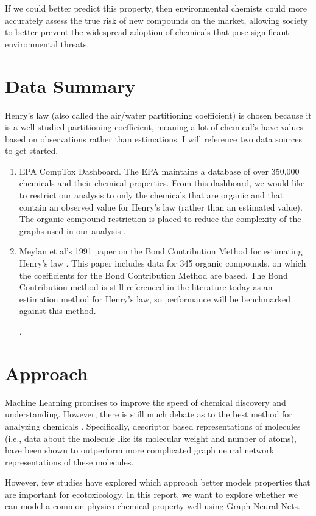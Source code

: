 \documentclass[12pt, oneside]{article}   	%
\begin{document}
If we could better predict this property, then environmental chemists could more accurately assess the true risk of new compounds on the market, allowing society to better prevent the widespread adoption of chemicals that pose significant environmental threats.

\section{Data Summary}
Henry's law (also called the air/water partitioning coefficient) is chosen because it is a well studied partitioning coefficient, meaning a lot of chemical's have values based on observations rather than estimations. I will reference two data sources to get started.
\begin{enumerate}
\item EPA CompTox Dashboard. The EPA maintains a database of over 350,000 chemicals and their chemical properties. From this dashboard, we would like to restrict our analysis to only the chemicals that are organic and that contain an observed value for Henry's law (rather than an estimated value). The organic compound restriction is placed to reduce the complexity of the graphs used in our analysis \cite{epa-comptox}. 
\item Meylan et al's 1991 paper on the Bond Contribution Method for estimating Henry's law \cite{meylan}. This paper includes data for 345 organic compounds, on which the coefficients for the Bond Contribution Method are based. The Bond Contribution method is still referenced in the literature today as an estimation method for Henry's law, so performance will be benchmarked against this method. 

.%
\end{enumerate}

\section{Approach}
Machine Learning promises to improve the speed of chemical discovery and understanding. However, there is still much debate as to the best method for analyzing chemicals \cite{Jiang:2021}. Specifically, descriptor based representations of molecules (i.e., data about the molecule like its molecular weight and number of atoms), have been shown to outperform more complicated graph neural network representations of these molecules.

However, few studies have explored which approach better models properties that are important for ecotoxicology. In this report, we want to explore whether we can model a common physico-chemical property well using Graph Neural Nets. 
\end{document}
